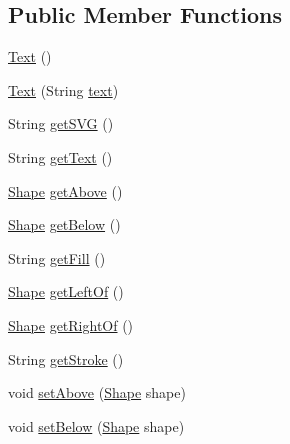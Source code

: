 \subsection*{Public Member Functions}
\begin{DoxyCompactItemize}
\item 
\hyperlink{classcom_1_1aarrelaakso_1_1drawl_1_1_text_a9d9bdd3df91ff551c7bf96f741cde0e9}{Text} ()
\item 
\hyperlink{classcom_1_1aarrelaakso_1_1drawl_1_1_text_ab135a782032f1985b39753bd303a3894}{Text} (String \hyperlink{classcom_1_1aarrelaakso_1_1drawl_1_1_text_a8889cc854715e5a1b9195ca490c03865}{text})
\item 
String \hyperlink{classcom_1_1aarrelaakso_1_1drawl_1_1_text_ab1a6091b007ea4da41de26bc8c6ea021}{get\+S\+VG} ()
\item 
String \hyperlink{classcom_1_1aarrelaakso_1_1drawl_1_1_text_a3f110fefbe3f5b9bdff79b6cabce18ba}{get\+Text} ()
\item 
\hyperlink{classcom_1_1aarrelaakso_1_1drawl_1_1_shape}{Shape} \hyperlink{classcom_1_1aarrelaakso_1_1drawl_1_1_shape_acebea2aa57031322323c9bf50ee447db}{get\+Above} ()
\item 
\hyperlink{classcom_1_1aarrelaakso_1_1drawl_1_1_shape}{Shape} \hyperlink{classcom_1_1aarrelaakso_1_1drawl_1_1_shape_a53de5ab609d879719cd3b372dfe8df58}{get\+Below} ()
\item 
String \hyperlink{classcom_1_1aarrelaakso_1_1drawl_1_1_shape_a0d9a33a3e151aaceeec140bea343a650}{get\+Fill} ()
\item 
\hyperlink{classcom_1_1aarrelaakso_1_1drawl_1_1_shape}{Shape} \hyperlink{classcom_1_1aarrelaakso_1_1drawl_1_1_shape_a2b19d5964ac46d545a7bae3133df6532}{get\+Left\+Of} ()
\item 
\hyperlink{classcom_1_1aarrelaakso_1_1drawl_1_1_shape}{Shape} \hyperlink{classcom_1_1aarrelaakso_1_1drawl_1_1_shape_a1ad573b06f341aa79f6a255a476ae6e4}{get\+Right\+Of} ()
\item 
String \hyperlink{classcom_1_1aarrelaakso_1_1drawl_1_1_shape_a4e1d54c7e161e3af5053939ddefdf9e6}{get\+Stroke} ()
\item 
void \hyperlink{classcom_1_1aarrelaakso_1_1drawl_1_1_shape_a942b3cf3365498dc1ac6b0309ce33b86}{set\+Above} (\hyperlink{classcom_1_1aarrelaakso_1_1drawl_1_1_shape}{Shape} shape)
\item 
void \hyperlink{classcom_1_1aarrelaakso_1_1drawl_1_1_shape_aa0ec0030515b5096820e4dd030c0b320}{set\+Below} (\hyperlink{classcom_1_1aarrelaakso_1_1drawl_1_1_shape}{Shape} shape)
\item 

\end{DoxyCompactItemize}
